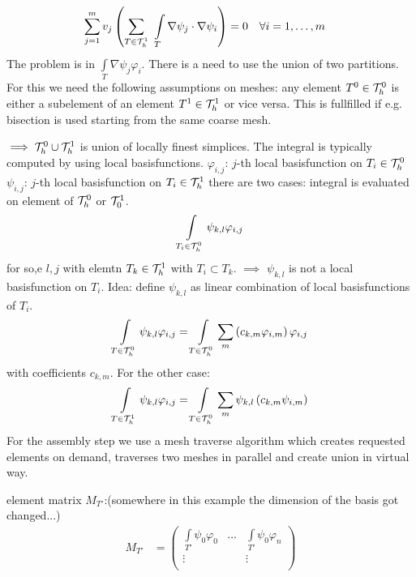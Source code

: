 \begin{example}
\begin{align*}
		\sum \limits_{j=1}^m v_j \left( \sum \limits_{T \in \T^1_h} \ \int \limits_T \nabla \psi_j \cdot \nabla \psi_i \right) &=0 \quad \forall i = 1, \dots,m
	\end{align*}
	The problem is in $\int \limits_T \nabla \psi_j  \varphi_i$. There is a need to use the union of two partitions. For this we need the following assumptions on meshes:\nl
	any element $T^0 \in \mathcal{T}^0_h$ is either a subelement of an element $T^1 \in \mathcal{T}^1_h$ or vice versa.
	This is fullfilled if e.g. bisection is used starting from the same coarse mesh.
	
	$\implies \mathcal{T}^0_h \cup \mathcal{T}^1_h$ is union of locally finest simplices. The integral is typically computed by using local basisfunctions.\nl
	$\varphi_{i,j}$: $j$-th local basisfunction on $T_i \in \mathcal{T}^0_h$\\
	$\psi_{i,j}$: $j$-th local basisfunction on $T_i \in \mathcal{T}^1_h$\nl
	there are two cases: integral is evaluated on element of $\mathcal{T}^0_h$ or $\mathcal{T}^1_0$.
	\begin{align*}
		\int \limits_{T_i  \in \mathcal{T}^0_h} \psi_{k,l} \varphi_{i,j}
	\end{align*}
	for so,e $l,j$ with elemtn $T_k \in \mathcal{T}^1_h$ with $T_i \subset T_k$. $\implies$ $\psi_{k,l}$ is not a local basisfunction on $T_i$.\nl
	Idea: define $\psi_{k,l}$ as linear combination of local basisfunctions of $T_i$.
	\begin{align*}
		\int \limits_{T \in \mathcal{T}^0_h} \psi_{k,l}\varphi_{i,j} = \int \limits_{T \in \mathcal{T}^0_h} \sum \limits_m \left( c_{k,m} \varphi_{i,m} \right)\varphi_{i,j}
	\end{align*}
	with coefficients $c_{k,m}$. For the other case: 
	\begin{align*}
	\int \limits_{T \in \mathcal{T}^1_h} \psi_{k,l}\varphi_{i,j} = \int \limits_{T \in \mathcal{T}^0_h} \sum \limits_m  \psi_{k,l} \left( c_{k,m} \psi_{i,m} \right)
	\end{align*}
	For the assembly step we use a mesh traverse algorithm which creates requested elements on demand, traverses two meshes in parallel and create union in virtual way.
	
	
	element matrix $M_{T'}$:(somewhere in this example the dimension of the basis got changed...) 
	\begin{align*}
		M_{T'}&= 
		\begin{pmatrix}
		\int \limits_{T'} \psi_0\varphi_0 & \dots & \int \limits_{T'} \psi_0\varphi_n \\
		\vdots 					 		  & 	  & \vdots\\

\end{pmatrix}
\end{align*}
\end{example}

